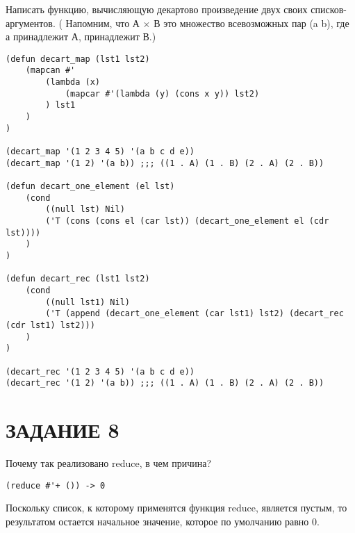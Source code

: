 Написать функцию, вычисляющую декартово произведение двух своих
списков-аргументов. ( Напомним, что А $\times$ В это множество
всевозможных пар (a b), где а принадлежит А, принадлежит В.)

\begin{lstlisting}
(defun decart_map (lst1 lst2)
    (mapcan #'
        (lambda (x)
            (mapcar #'(lambda (y) (cons x y)) lst2)
        ) lst1
    )
)

(decart_map '(1 2 3 4 5) '(a b c d e))
(decart_map '(1 2) '(a b)) ;;; ((1 . A) (1 . B) (2 . A) (2 . B))

(defun decart_one_element (el lst)
    (cond
        ((null lst) Nil)
        ('T (cons (cons el (car lst)) (decart_one_element el (cdr lst))))
    )
)

(defun decart_rec (lst1 lst2)
    (cond
        ((null lst1) Nil)
        ('T (append (decart_one_element (car lst1) lst2) (decart_rec (cdr lst1) lst2)))
    )
)

(decart_rec '(1 2 3 4 5) '(a b c d e))
(decart_rec '(1 2) '(a b)) ;;; ((1 . A) (1 . B) (2 . A) (2 . B))
\end{lstlisting}

\section{ЗАДАНИЕ 8}

Почему так реализовано reduce, в чем причина?

\begin{lstlisting}
(reduce #'+ ()) -> 0
\end{lstlisting}

Поскольку список, к которому применятся функция {\ttfamily reduce},
является пустым, то результатом остается начальное значение,
которое по умолчанию равно 0.
